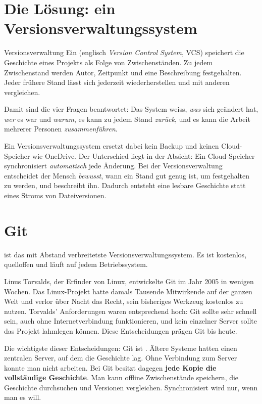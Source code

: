 \section{Die Lösung: ein Versionsverwaltungssystem}

\begin{definition}{Versionsverwaltung}
Ein  (englisch \emph{Version Control System}, VCS)
speichert die Geschichte eines Projekts als Folge von Zwischenständen. Zu jedem
Zwischenstand werden Autor, Zeitpunkt und eine Beschreibung festgehalten. Jeder frühere
Stand lässt sich jederzeit wiederherstellen und mit anderen vergleichen.
\end{definition}

Damit sind die vier Fragen beantwortet: Das System weiss, \emph{was} sich geändert hat,
\emph{wer} es war und \emph{warum}, es kann zu jedem Stand \emph{zurück}, und es kann die
Arbeit mehrerer Personen \emph{zusammenführen}.

Ein Versionsverwaltungssystem ersetzt dabei kein Backup und keinen Cloud-Speicher wie
OneDrive. Der Unterschied liegt in der Absicht: Ein Cloud-Speicher synchronisiert
\emph{automatisch} jede Änderung. Bei der Versionsverwaltung entscheidet der Mensch
\emph{bewusst}, wann ein Stand gut genug ist, um festgehalten zu werden, und beschreibt ihn.
Dadurch entsteht eine lesbare Geschichte statt eines Stroms von Dateiversionen.

\section{Git}

 ist das mit Abstand verbreitetste Versionsverwaltungssystem. Es ist kostenlos,
quelloffen und läuft auf jedem Betriebssystem.

\begin{hintergrund}
Linus Torvalds, der Erfinder von Linux, entwickelte Git im Jahr 2005 in wenigen Wochen.
Das Linux-Projekt hatte damals Tausende Mitwirkende auf der ganzen Welt und verlor über
Nacht das Recht, sein bisheriges Werkzeug kostenlos zu nutzen. Torvalds' Anforderungen waren
entsprechend hoch: Git sollte sehr schnell sein, auch ohne Internetverbindung funktionieren,
und kein einzelner Server sollte das Projekt lahmlegen können. Diese Entscheidungen prägen
Git bis heute.
\end{hintergrund}

Die wichtigste dieser Entscheidungen: Git ist . Ältere Systeme hatten
einen zentralen Server, auf dem die Geschichte lag. Ohne Verbindung zum Server konnte man
nicht arbeiten. Bei Git besitzt dagegen \textbf{jede Kopie die vollständige Geschichte}.
Man kann offline Zwischenstände speichern, die Geschichte durchsuchen und Versionen
vergleichen. Synchronisiert wird nur, wenn man es will.

